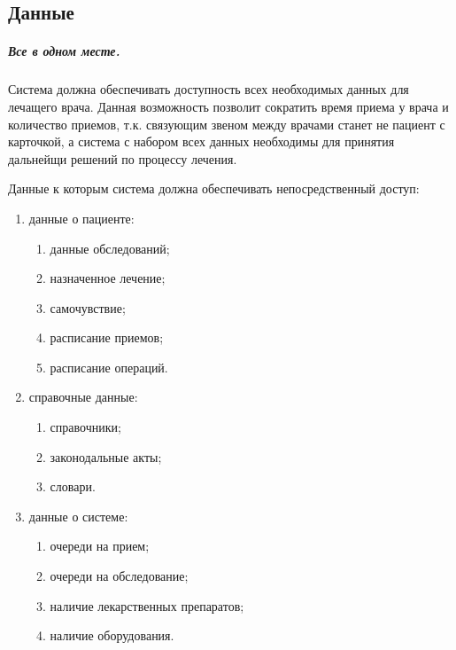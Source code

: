 \subsection{Данные}
\subparagraph{Все в одном месте.}
Система должна обеспечивать доступность всех необходимых данных для лечащего
врача. Данная возможность позволит сократить время приема у врача и количество
приемов, т.к. связующим звеном между врачами станет не пациент с карточкой, а
система с набором всех данных необходимы для принятия дальнейщи решений по
процессу лечения.

Данные к которым система должна обеспечивать непосредственный доступ:

\begin{enumerate}
  \item данные о пациенте:
  \begin{enumerate}
    \item данные обследований;
    \item назначенное лечение;
    \item самочувствие;
    \item расписание приемов;
    \item расписание операций.
  \end{enumerate}
  \item справочные данные:
  \begin{enumerate}
    \item справочники;
    \item законодальные акты;
    \item словари.
  \end{enumerate}
  \item данные о системе:
  \begin{enumerate}
    \item очереди на прием;
    \item очереди на обследование;
    \item наличие лекарственных препаратов;
    \item наличие оборудования.
  \end{enumerate}     
\end{enumerate}




